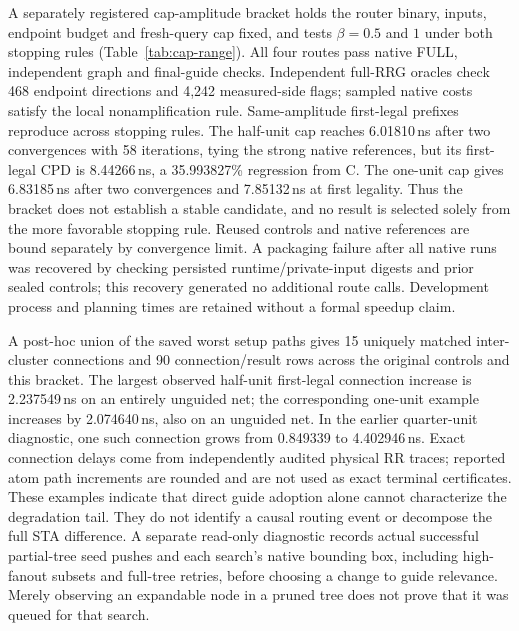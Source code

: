 
A separately registered cap-amplitude bracket holds the router binary, inputs, endpoint budget and fresh-query cap fixed, and tests $\beta=0.5$ and $1$ under both stopping rules (Table~\ref{tab:cap-range}). All four routes pass native FULL, independent graph and final-guide checks. Independent full-RRG oracles check 468 endpoint directions and 4,242 measured-side flags; sampled native costs satisfy the local nonamplification rule. Same-amplitude first-legal prefixes reproduce across stopping rules. The half-unit cap reaches 6.01810\,ns after two convergences with 58 iterations, tying the strong native references, but its first-legal CPD is 8.44266\,ns, a 35.993827\% regression from C. The one-unit cap gives 6.83185\,ns after two convergences and 7.85132\,ns at first legality. Thus the bracket does not establish a stable candidate, and no result is selected solely from the more favorable stopping rule. Reused controls and native references are bound separately by convergence limit. A packaging failure after all native runs was recovered by checking persisted runtime/private-input digests and prior sealed controls; this recovery generated no additional route calls. Development process and planning times are retained without a formal speedup claim.

A post-hoc union of the saved worst setup paths gives 15 uniquely matched inter-cluster connections and 90 connection/result rows across the original controls and this bracket. The largest observed half-unit first-legal connection increase is 2.237549\,ns on an entirely unguided net; the corresponding one-unit example increases by 2.074640\,ns, also on an unguided net. In the earlier quarter-unit diagnostic, one such connection grows from 0.849339 to 4.402946\,ns. Exact connection delays come from independently audited physical RR traces; reported atom path increments are rounded and are not used as exact terminal certificates. These examples indicate that direct guide adoption alone cannot characterize the degradation tail. They do not identify a causal routing event or decompose the full STA difference. A separate read-only diagnostic records actual successful partial-tree seed pushes and each search's native bounding box, including high-fanout subsets and full-tree retries, before choosing a change to guide relevance. Merely observing an expandable node in a pruned tree does not prove that it was queued for that search.


